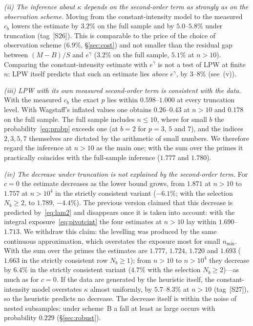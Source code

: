 \documentclass[11pt,a4paper]{article}
\theoremstyle{plain}
\theoremstyle{remark}
\newcommand{\eg}{e^{\gamma}}
\begin{document}
\emph{(ii) The inference about $\kappa$ depends on the second-order term as
strongly as on the observation scheme.} Moving from the constant-intensity model
to the measured $c_b$ lowers the estimate by $3.2\%$ on the full sample and by
$5.0$--$5.8\%$ under truncation (tag~[S26]). This is comparable to the price of
the choice of observation scheme ($6.9\%$, \S\ref{sec:cost}) and not smaller
than the residual gap between $(M-B)/S$ and $\eg$ ($3.2\%$ on the full sample,
$5.1\%$ at $n>10$). Comparing the constant-intensity estimate with $\eg$ is not a
test of LPW at finite $n$: LPW itself predicts that such an estimate lies
\emph{above} $\eg$, by $3$--$8\%$ (see~(v)).

\emph{(iii) LPW with its own measured second-order term is consistent with the
data.} With the measured $c_b$ the exact $p$ lies within $0.598$--$1.000$ at every
truncation level. With Wagstaff's inflated values one obtains $0.26$--$0.43$ at
$n>10$ and $0.178$ on the full sample. The full sample includes $n\le10$, where
for small $b$ the probability~\eqref{eq:probp} exceeds one (at $b=2$ for $p=3$,
$5$ and $7$), and the indices $2,3,5,7$ themselves are dictated by the arithmetic of
small numbers. We therefore regard the inference at $n>10$ as the main one; with
the sum over the primes it practically coincides with the full-sample inference
($1.777$ and $1.780$).

\emph{(iv) The decrease under truncation is not explained by the second-order
term.} For $c=0$ the estimate decreases as the lower bound grows, from $1.871$ at
$n>10$ to $1.757$ at $n>10^4$ in the strictly consistent variant ($-6.1\%$; with
the selection $N_b\ge2$, to $1.789$, $-4.4\%$). The previous version claimed that this
decrease is predicted by~\eqref{eq:lam2} and disappears once it is taken into
account: with the integral exposure~\eqref{eq:pivotcint} the four estimates at
$n>10$ lay within $1.690$--$1.713$. We withdraw this claim: the levelling was
produced by the same continuous approximation, which overstates the exposure most
for small $n_{\min}$. With the sum over the primes the estimates are $1.777$,
$1.724$, $1.720$ and $1.693$ ($1.663$ in the strictly consistent row $N_b\ge1$);
from $n>10$ to $n>10^4$ they decrease by $6.4\%$ in the strictly consistent
variant ($4.7\%$ with the selection $N_b\ge2$)---as much as for $c=0$. If
the data are generated by the heuristic itself, the constant-intensity model
overstates $\kappa$ almost uniformly, by $5.7$--$8.3\%$ at $n>10$ (tag~[S27]), so
the heuristic predicts no decrease. The decrease itself is within the noise of
nested subsamples: under scheme~B a fall at least as large occurs with probability
$0.229$ (\S\ref{sec:robust}).
\end{document}
